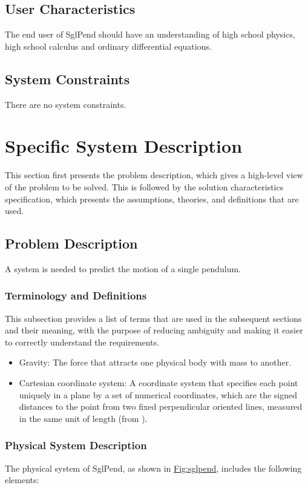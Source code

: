 \documentclass[12pt]{article}
\begin{document}
\subsection{User Characteristics}
\label{Sec:UserChars}
The end user of SglPend should have an understanding of high school physics, high school calculus and ordinary differential equations.

\subsection{System Constraints}
\label{Sec:SysConstraints}
There are no system constraints.

\section{Specific System Description}
\label{Sec:SpecSystDesc}
This section first presents the problem description, which gives a high-level view of the problem to be solved. This is followed by the solution characteristics specification, which presents the assumptions, theories, and definitions that are used.

\subsection{Problem Description}
\label{Sec:ProbDesc}
A system is needed to predict the motion of a single pendulum.

\subsubsection{Terminology and Definitions}
\label{Sec:TermDefs}
This subsection provides a list of terms that are used in the subsequent sections and their meaning, with the purpose of reducing ambiguity and making it easier to correctly understand the requirements.

\begin{itemize}
\item{Gravity: The force that attracts one physical body with mass to another.}
\item{Cartesian coordinate system: A coordinate system that specifies each point uniquely in a plane by a set of numerical coordinates, which are the signed distances to the point from two fixed perpendicular oriented lines, measured in the same unit of length (from \cite{cartesianWiki}).}
\end{itemize}
\subsubsection{Physical System Description}
\label{Sec:PhysSyst}
The physical system of SglPend, as shown in \hyperref[Figure:sglpend]{Fig:sglpend}, includes the following elements:
\end{document}
